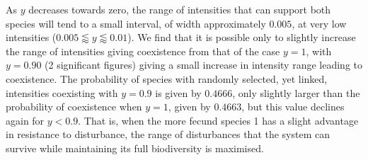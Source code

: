 As $y$ decreases towards zero, the range of intensities that can support both species will tend to a small interval, of width approximately $0.005$, at very low intensities ($0.005\lessapprox y \lessapprox 0.01$). We find that it is possible only to slightly increase the range of intensities giving coexistence from that of the case $y=1$, with $y=0.90$ (2 significant figures) giving a small increase in intensity range leading to coexistence. The probability of species with randomly selected, yet linked, intensities coexisting with $y=0.9$ is given by $0.4666$, only slightly larger than the probability of coexistence when $y=1$, given by $0.4663$, but this value declines again for $y<0.9$. That is, when the more fecund species 1 has a slight advantage in resistance to disturbance, the range of disturbances that the system can survive while maintaining its full biodiversity is maximised.

